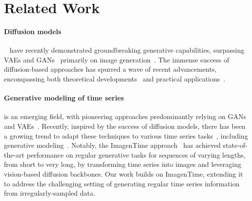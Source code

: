 \documentclass{article}
\theoremstyle{plain}
\theoremstyle{definition}
\theoremstyle{remark}
\begin{document}



\vspace{-3mm}
\section{Related Work}
\label{sec:related}
\vspace{-2mm}

\paragraph{Diffusion models}\hspace{-3.5mm}~\cite{sohl2015deep} have recently demonstrated groundbreaking generative capabilities, surpassing VAEs and GANs~\cite{kingma2014auto,goodfellow2014generative} primarily on image generation~\cite{ho2020denoising, dhariwal2021diffusion, rombach2022high}. The immense success of diffusion-based approaches has spurred a wave of recent advancements, encompassing both theoretical developments~\cite{song2021score, lipman2023flow} and practical applications~\cite{lugmayr2022repaint, ho2022video, kreuk2023audiogen}.
\vspace{-2mm}

\paragraph{Generative modeling of time series}\hspace{-3mm} is an emerging field, with pioneering approaches predominantly relying on GANs~\cite{yoon2019time, liao2020conditional, li2022tts} and VAEs~\cite{desai2021timevae, naiman2024generative}. Recently, inspired by the success of diffusion models, there has been a growing trend to adapt these techniques to various time series tasks~\cite{tashiro2021csdi, rasul2021autoregressive}, including generative modeling~\cite{coletta2023constrained, yuan2024diffusion}. Notably, the ImagenTime approach~\cite{naiman2024utilizing} has achieved state-of-the-art performance on regular generative tasks for sequences of varying lengths, from short to very long, by transforming time series into images and leveraging vision-based diffusion backbones. Our work builds on ImagenTime, extending it to address the challenging setting of generating regular time series information from irregularly-sampled data.
\vspace{-2mm}
\end{document}
